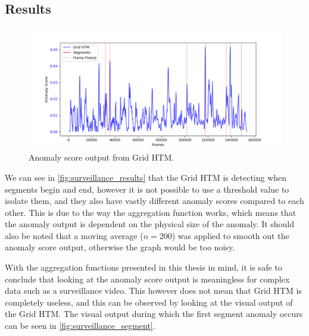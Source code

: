 \subsection{Results}
\begin{figure}[H]
    \centering
    \includegraphics[width=\textwidth]{resources/experiments/surveillance/surveillance_result.png}
    \caption{Anomaly score output from Grid HTM.}
    \label{fig:surveillance_results}
\end{figure}
We can see in \autoref{fig:surveillance_results} that the Grid HTM is detecting when segments begin and end, however it is not possible to use a threshold value to isolate them, and they also have vastly different anomaly scores compared to each other. This is due to the way the aggregation function works, which means that the anomaly output is dependent on the physical size of the anomaly. It should also be noted that a moving average ($n=200$) was applied to smooth out the anomaly score output, otherwise the graph would be too noisy.
\par
With the aggregation functions presented in this thesis in mind, it is safe to conclude that looking at the anomaly score output is meaningless for complex data such as a surveillance video. This however does not mean that Grid HTM is completely useless, and this can be observed by looking at the visual output of the Grid HTM. The visual output during which the first segment anomaly occurs can be seen in \autoref{fig:surveillance_segment}.
